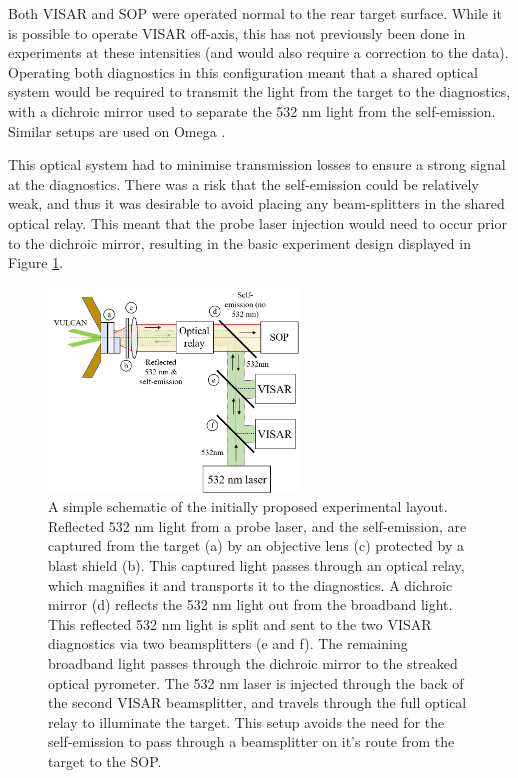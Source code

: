 Both VISAR and SOP were operated normal to the rear target surface. While it is possible to operate VISAR off-axis, this has not previously been done in experiments at these intensities (and would also require a correction to the data). Operating both diagnostics in this configuration meant that a shared optical system would be required to transmit the light from the target to the diagnostics, with a dichroic mirror used to separate the 532 nm light from the self-emission. Similar setups are used on Omega \cite{Miller2007, Gregor2016}.

This optical system had to minimise transmission losses to ensure a strong signal at the diagnostics. There was a risk that the self-emission could be relatively weak, and thus it was desirable to avoid placing any beam-splitters in the shared optical relay. This meant that the probe laser injection would need to occur prior to the dichroic mirror, resulting in the basic experiment design displayed in Figure \ref{fig:Simple experiment schematic}.

\begin{figure}
  \centering
\includegraphics[width=0.6\textwidth]{figures/Experiment/Simple experiment schematic.png}%
\caption{\label{fig:Simple experiment schematic} A simple schematic of the initially proposed experimental layout. Reflected 532 nm light from a probe laser, and the self-emission, are captured from the target (a) by an objective lens (c) protected by a blast shield (b). This captured light passes through an optical relay, which magnifies it and transports it to the diagnostics. A dichroic mirror (d) reflects the 532 nm light out from the broadband light. This reflected 532 nm light is split and sent to the two VISAR diagnostics via two beamsplitters (e and f). The remaining broadband light passes through the dichroic mirror to the streaked optical pyrometer. The 532 nm laser is injected through the back of the second VISAR beamsplitter, and travels through the full optical relay to illuminate the target. This setup avoids the need for the self-emission to pass through a beamsplitter on it's route from the target to the SOP.  }
\end{figure}

